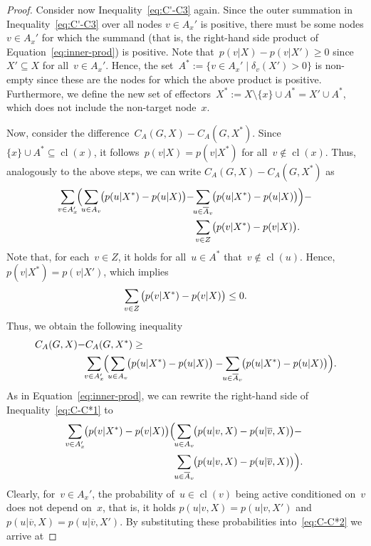 \documentclass{article}
\DeclareMathOperator{\cl}{cl}
\begin{document}
\begin{proof}
  Consider now Inequality~\eqref{eq:C'-C3} again.
  Since the outer summation in Inequality~\eqref{eq:C'-C3} over all nodes $v \in A_x'$ is positive,
  there must be some nodes $v \in A_x'$ for which the summand (that
  is, the right-hand side product of Equation~\eqref{eq:inner-prod})
  is positive.
  Note that~$p(v|X)-p(v|X')\ge 0$ since~$X'\subseteq X$ for all~$v\in
  A_x'$.
  Hence, the set~$A^*:=\{v\in A_x'\mid \delta_v(X') > 0\}$ is non-empty
  since these are the nodes for which the above product is positive.
  Furthermore, we define the new set of effectors~$X^*:=X\setminus\{x\}\cup A^* = X'\cup A^*$,
  which does not include the non-target node~$x$.

  Now, consider the difference~$C_A(G,X)-C_A(G,X^*)$.
  Since~$\{x\}\cup A^*\subseteq \cl(x)$, it follows~$p(v|X)=p(v|X^*)$
  for all~$v\not\in\cl(x)$.
  Thus, analogously to the above steps, we can write
  $C_A(G,X)-C_A(G,X^*)$ as
  \begin{align*}
    \smashoperator{\sum_{v\in A_x'}}\Big(\smashoperator{\sum_{u \in
        A_v}}\big(p(u|X^*)-p(u|X)\big)-
    &\smashoperator{\sum_{u \in
    \overline{A}_v}}\big(p(u|X^*) - p(u|X)\big)\Big) -\\
    &\smashoperator{\sum_{v\in Z}}\big(p(v|X^*)-p(v|X)\big).
  \end{align*}
  Note that, for each~$v\in Z$, it holds for
  all~$u\in A^*$ that~$v\not\in \cl(u)$.
  Hence, $p(v|X^*) = p(v|X')$, which implies
  \[\smashoperator{\sum_{v\in Z}}\big(p(v|X^*)-p(v|X)\big)\le 0.\]
  Thus, we obtain the following inequality
  \begin{align}
    C_A(G,X)-&C_A(G,X^*) \ge\nonumber\\
    &\smashoperator{\sum_{v\in A_x'}}\Big(\smashoperator{\sum_{u \in
        A_v}}\big(p(u|X^*)-p(u|X)\big)-
    \smashoperator{\sum_{u \in
    \overline{A}_v}}\big(p(u|X^*) - p(u|X)\big)\Big).\label{eq:C-C*1}
  \end{align}
  As in Equation~\eqref{eq:inner-prod}, we can rewrite the right-hand side of Inequality~\eqref{eq:C-C*1} to
  \begin{align}
    \smashoperator{\sum_{v\in A_x'}}\big(p(v|X^*)-p(v|X)\big)\Big(&\smashoperator{\sum_{u \in
        A_v}}\big(p(u|v,X)-p(u|\overline{v},X)\big) -\nonumber\\
      &\smashoperator{\sum_{u \in \overline{A}_v}}\big(p(u|v,X)-p(u|\overline{v},X)\big)\Big).\label{eq:C-C*2}
  \end{align}
  Clearly, for~$v\in A_x'$, the probability of~$u\in\cl(v)$ being
  active conditioned on~$v$ does not depend on~$x$,
  that is, it holds
    $p(u|v,X) = p(u|v,X')$ and
    $p(u|\overline{v},X) = p(u|\overline{v},X')$.
  By substituting these probabilities into~\eqref{eq:C-C*2} we
  arrive at


\end{proof}
\end{document}
